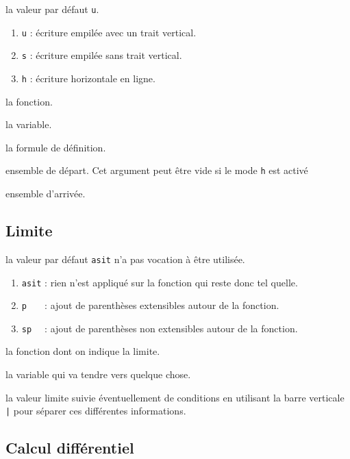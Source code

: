 \documentclass[12pt,a4paper]{book}
\theoremstyle{definition}
\begin{document}
{{


\IDoption{}  la valeur par défaut \verb+u+. 
\begin{enumerate}
	\item \verb+u+ : écriture empilée avec un trait vertical.
	
	\item \verb+s+ : écriture empilée sans trait vertical.

	\item \verb+h+ : écriture horizontale en ligne.
\end{enumerate}


 la fonction.

 la variable.

 la formule de définition.

 ensemble de départ. Cet argument peut être vide si le mode \verb+h+ est activé

 ensemble d'arrivée.


\subsection{Limite}





\IDoption{}  la valeur par défaut \verb+asit+ n'a pas vocation à être utilisée. 
\begin{enumerate}
	\item \verb+asit+ : rien n'est appliqué sur la fonction qui reste donc tel quelle.
	
	\item \verb+p   + : ajout de parenthèses extensibles autour de la fonction.

	\item \verb+sp  + : ajout de parenthèses non extensibles autour de la fonction.
\end{enumerate}


 la fonction dont on indique la limite.

 la variable qui va tendre vers quelque chose.

 la valeur limite suivie éventuellement de conditions en utilisant la barre verticale \verb+|+ pour séparer ces différentes informations.


\subsection{Calcul différentiel}

}}
\end{document}
